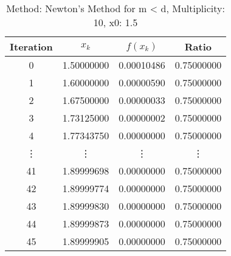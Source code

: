\begin{table}
\centering
\caption{Method: Newton's Method for m < d, Multiplicity: 10, x0: 1.5}
\label{tab:table_Newton's_Method_for_m_<_d_10_1_5}
\begin{tabular}{c c c c}
\toprule
Iteration &      $x_k$ &   $f(x_k)$ &      Ratio \\
\midrule
        0 & 1.50000000 & 0.00010486 & 0.75000000 \\
        1 & 1.60000000 & 0.00000590 & 0.75000000 \\
        2 & 1.67500000 & 0.00000033 & 0.75000000 \\
        3 & 1.73125000 & 0.00000002 & 0.75000000 \\
        4 & 1.77343750 & 0.00000000 & 0.75000000 \\
   \vdots &     \vdots &     \vdots &     \vdots \\
       41 & 1.89999698 & 0.00000000 & 0.75000000 \\
       42 & 1.89999774 & 0.00000000 & 0.75000000 \\
       43 & 1.89999830 & 0.00000000 & 0.75000000 \\
       44 & 1.89999873 & 0.00000000 & 0.75000000 \\
       45 & 1.89999905 & 0.00000000 & 0.75000000 \\
\bottomrule
\end{tabular}
\end{table}

